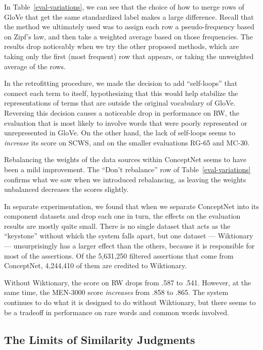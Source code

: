 \documentclass[11pt,letterpaper]{article}
\begin{document}
In Table~\ref{eval-variations}, we can see that the choice of how to merge rows
of GloVe that get the same standardized label makes a large difference.  Recall
that the method we ultimately used was to assign each row a pseudo-frequency
based on Zipf's law, and then take a weighted average based on those
frequencies.  The results drop noticeably when we try the other proposed
methods, which are taking only the first (most frequent) row that appears, or
taking the unweighted average of the rows.

In the retrofitting procedure, we made the decision to add ``self-loops'' that
connect each term to itself, hypothesizing that this would help stabilize the
representations of terms that are outside the original vocabulary of GloVe.
Reversing this decision causes a noticeable drop in performance on RW, the
evaluation that is most likely to involve words that were poorly represented or
unrepresented in GloVe. On the other hand, the lack of self-loops seems to {\em
increase} its score on SCWS, and on the smaller evaluations RG-65 and MC-30.

Rebalancing the weights of the data sources within ConceptNet seems to have
been a mild improvement. The ``Don't rebalance'' row of Table~\ref{eval-variations}
confirms what we saw when we introduced rebalancing,
as leaving the weights unbalanced decreases the scores slightly.

In separate experimentation, we found that when we separate ConceptNet into its
component datasets and drop each one in turn, the effects on the evaluation
results are mostly quite small. There is no single dataset that acts as the
``keystone'' without which the system falls apart, but one dataset ---
Wiktionary --- unsurprisingly has a larger effect than the others, because it
is responsible for most of the assertions. Of the 5,631,250 filtered assertions
that come from ConceptNet, 4,244,410 of them are credited to Wiktionary.

Without Wiktionary, the score on RW drops from .587 to .541. However, at the
same time, the MEN-3000 score {\em increases} from .858 to .865. The system
continues to do what it is designed to do without Wiktionary, but there seems to
be a tradeoff in performance on rare words and common words involved.

\subsection{The Limits of Similarity Judgments}
\end{document}
